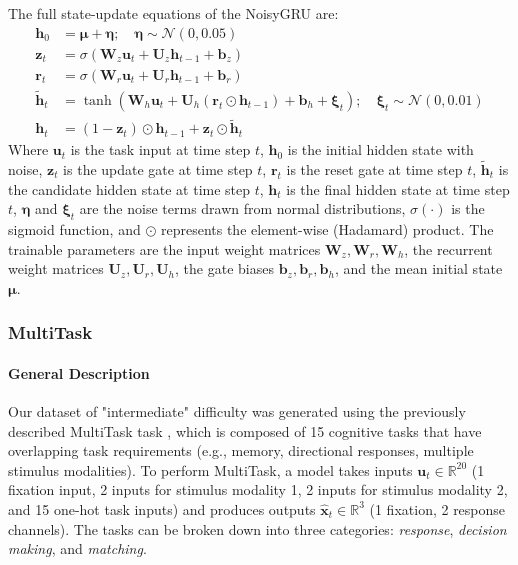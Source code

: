 \documentclass{article}
\begin{document}
The full state-update equations of the NoisyGRU are:
\begin{align}
\mathbf{h}_0 &= \mathbf{\mu} + \mathbf{\eta}; \quad \mathbf{\eta} \sim \mathcal{N}(0, 0.05) \\
\mathbf{z}_t &= \sigma(\mathbf{W}_z \mathbf{u}_t + \mathbf{U}_z \mathbf{h}_{t-1} + \mathbf{b}_z) \\
\mathbf{r}_t &= \sigma(\mathbf{W}_r \mathbf{u}_t + \mathbf{U}_r \mathbf{h}_{t-1} + \mathbf{b}_r) \\
\tilde{\mathbf{h}}_t &= \tanh(\mathbf{W}_h \mathbf{u}_t + \mathbf{U}_h (\mathbf{r}_t \odot \mathbf{h}_{t-1}) + \mathbf{b}_h + \mathbf{\xi}_t); \quad \mathbf{\xi}_t \sim \mathcal{N}(0, 0.01) \\
\mathbf{h}_t &= (1 - \mathbf{z}_t) \odot \mathbf{h}_{t-1} + \mathbf{z}_t \odot \tilde{\mathbf{h}}_t
\end{align}
Where $\mathbf{u}_t$ is the task input at time step $t$, $\mathbf{h}_0$ is the initial hidden state with noise, $\mathbf{z}_t$ is the update gate at time step $t$, $\mathbf{r}_t$ is the reset gate at time step $t$, $\tilde{\mathbf{h}}_t$ is the candidate hidden state at time step $t$, $\mathbf{h}_t$ is the final hidden state at time step $t$, $\mathbf{\eta}$ and $\mathbf{\xi}_t$ are the noise terms drawn from normal distributions, $\sigma(\cdot)$ is the sigmoid function, and $\odot$ represents the element-wise (Hadamard) product. The trainable parameters are the input weight matrices $\mathbf{W}_z, \mathbf{W}_r, \mathbf{W}_h$, the recurrent weight matrices $\mathbf{U}_z, \mathbf{U}_r, \mathbf{U}_h$, the gate biases $\mathbf{b}_z, \mathbf{b}_r, \mathbf{b}_h$, and the mean initial state $\mathbf{\mu}$.


\clearpage
\subsubsection{MultiTask \label{appendix:TT-TaskEnvs-MultiTask}}
\paragraph{General Description}
Our dataset of "intermediate" difficulty was generated using the previously described MultiTask task \cite{yang_task_2019, driscoll_flexible_2022}, which is composed of 15 cognitive tasks that have overlapping task requirements (e.g., memory, directional responses, multiple stimulus modalities). To perform MultiTask, a model takes inputs $\mathbf{u}_t \in \mathbb{R}^{20}$ (1 fixation input, 2 inputs for stimulus modality 1, 2 inputs for stimulus modality 2, and 15 one-hot task inputs) and produces outputs $\hat{\mathbf{x}}_t \in \mathbb{R}^3$ (1 fixation, 2 response channels). The tasks can be broken down into three categories: \textit{response}, \textit{decision making}, and \textit{matching}.
\end{document}

